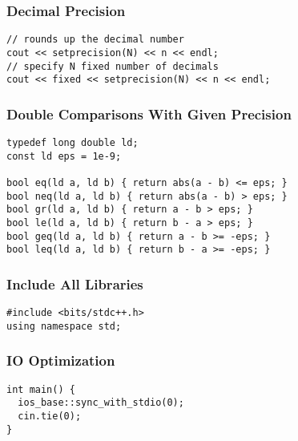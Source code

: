 \documentclass[twoside]{article}
\begin{document}
\begin{multicols*}{2}
\subsubsectionfont{\large\bfseries\sffamily\underline}
\subsubsection*{Decimal Precision}
\begin{verbatim}
// rounds up the decimal number
cout << setprecision(N) << n << endl;
// specify N fixed number of decimals
cout << fixed << setprecision(N) << n << endl;
\end{verbatim}

\subsubsectionfont{\large\bfseries\sffamily\underline}
\subsubsection*{Double Comparisons With Given Precision}
\begin{verbatim}
typedef long double ld;
const ld eps = 1e-9;

bool eq(ld a, ld b) { return abs(a - b) <= eps; }
bool neq(ld a, ld b) { return abs(a - b) > eps; }
bool gr(ld a, ld b) { return a - b > eps; }
bool le(ld a, ld b) { return b - a > eps; }
bool geq(ld a, ld b) { return a - b >= -eps; }
bool leq(ld a, ld b) { return b - a >= -eps; }
\end{verbatim}

\subsubsectionfont{\large\bfseries\sffamily\underline}
\subsubsection*{Include All Libraries}
\begin{verbatim}
#include <bits/stdc++.h>
using namespace std;
\end{verbatim}

\subsubsectionfont{\large\bfseries\sffamily\underline}
\subsubsection*{IO Optimization}
\begin{verbatim}
int main() {
  ios_base::sync_with_stdio(0);
  cin.tie(0);
}
\end{verbatim}


\end{multicols*}
\end{document}
